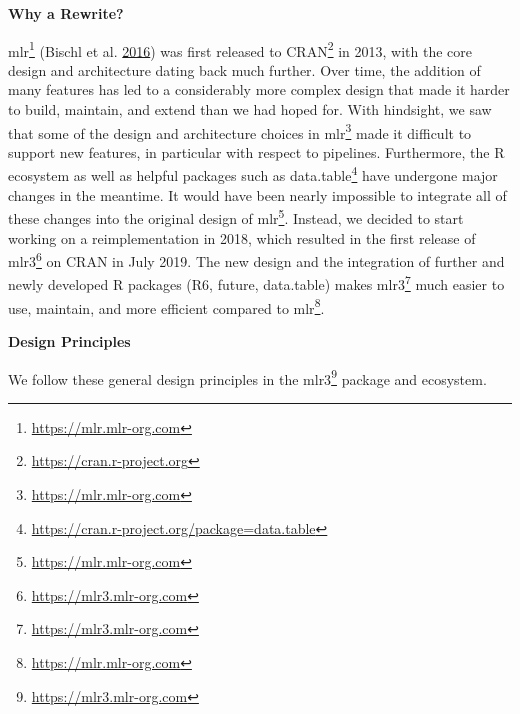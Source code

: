 \documentclass[12pt,]{scrbook}
\renewcommand{\href}[2]{#2\footnote{\url{#1}}}
\begin{document}
\textbf{Why a Rewrite?}

\href{https://mlr.mlr-org.com}{mlr} (Bischl et al. \protect\hyperlink{ref-mlr}{2016}) was first released to \href{https://cran.r-project.org}{CRAN} in 2013, with the core design and architecture dating back much further.
Over time, the addition of many features has led to a considerably more complex design that made it harder to build, maintain, and extend than we had hoped for.
With hindsight, we saw that some of the design and architecture choices in \href{https://mlr.mlr-org.com}{mlr} made it difficult to support new features, in particular with respect to pipelines.
Furthermore, the R ecosystem as well as helpful packages such as \href{https://cran.r-project.org/package=data.table}{data.table} have undergone major changes in the meantime.
It would have been nearly impossible to integrate all of these changes into the original design of \href{https://mlr.mlr-org.com}{mlr}.
Instead, we decided to start working on a reimplementation in 2018, which resulted in the first release of \href{https://mlr3.mlr-org.com}{mlr3} on CRAN in July 2019.
The new design and the integration of further and newly developed R packages (R6, future, data.table) makes \href{https://mlr3.mlr-org.com}{mlr3} much easier to use, maintain, and more efficient compared to \href{https://mlr.mlr-org.com}{mlr}.

\textbf{Design Principles}

We follow these general design principles in the \href{https://mlr3.mlr-org.com}{mlr3} package and ecosystem.
\end{document}
